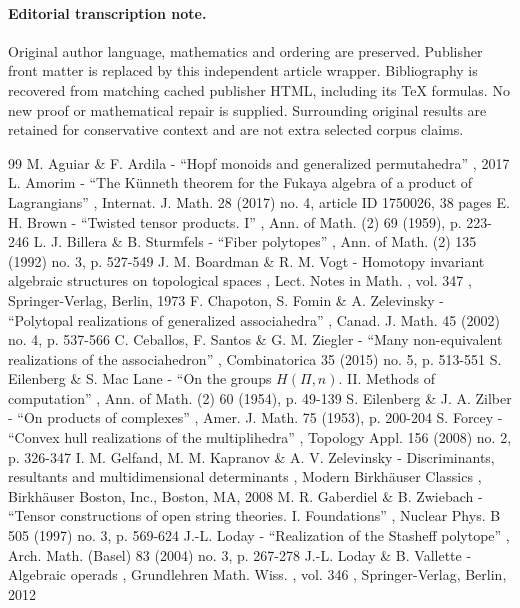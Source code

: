 \documentclass[11pt]{article}
\numberwithin{equation}{section}\providecommand{\No}{}
\begin{document}
\paragraph{Editorial transcription note.}
Original author language, mathematics and ordering are preserved. Publisher front matter is replaced by this independent article wrapper. Bibliography is recovered from matching cached publisher HTML, including its TeX formulas. No new proof or mathematical repair is supplied. Surrounding original results are retained for conservative context and are not extra selected corpus claims.
\clearpage

\begin{thebibliography}{99}
 M. Aguiar \& F. Ardila - “Hopf monoids and generalized permutahedra” , 2017
 L. Amorim - “The Künneth theorem for the Fukaya algebra of a product of Lagrangians” , Internat. J. Math. 28 (2017) no. 4, article ID 1750026, 38 pages
 E. H. Brown - “Twisted tensor products. I” , Ann. of Math. (2) 69 (1959), p. 223-246
 L. J. Billera \& B. Sturmfels - “Fiber polytopes” , Ann. of Math. (2) 135 (1992) no. 3, p. 527-549
 J. M. Boardman \& R. M. Vogt - Homotopy invariant algebraic structures on topological spaces , Lect. Notes in Math. , vol. 347 , Springer-Verlag, Berlin, 1973
 F. Chapoton, S. Fomin \& A. Zelevinsky - “Polytopal realizations of generalized associahedra” , Canad. J. Math. 45 (2002) no. 4, p. 537-566
 C. Ceballos, F. Santos \& G. M. Ziegler - “Many non-equivalent realizations of the associahedron” , Combinatorica 35 (2015) no. 5, p. 513-551
 S. Eilenberg \& S. Mac Lane - “On the groups $H(\Pi ,n)$. II. Methods of computation” , Ann. of Math. (2) 60 (1954), p. 49-139
 S. Eilenberg \& J. A. Zilber - “On products of complexes” , Amer. J. Math. 75 (1953), p. 200-204
 S. Forcey - “Convex hull realizations of the multiplihedra” , Topology Appl. 156 (2008) no. 2, p. 326-347
 I. M. Gelfand, M. M. Kapranov \& A. V. Zelevinsky - Discriminants, resultants and multidimensional determinants , Modern Birkhäuser Classics , Birkhäuser Boston, Inc., Boston, MA, 2008
 M. R. Gaberdiel \& B. Zwiebach - “Tensor constructions of open string theories. I. Foundations” , Nuclear Phys. B 505 (1997) no. 3, p. 569-624
 J.-L. Loday - “Realization of the Stasheff polytope” , Arch. Math. (Basel) 83 (2004) no. 3, p. 267-278
 J.-L. Loday \& B. Vallette - Algebraic operads , Grundlehren Math. Wiss. , vol. 346 , Springer-Verlag, Berlin, 2012

\end{thebibliography}
\end{document}
